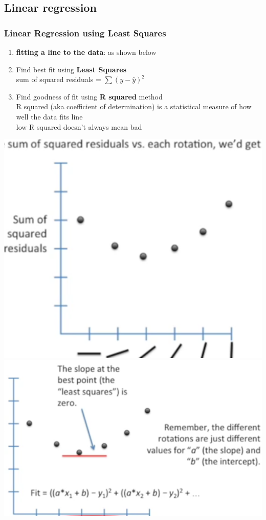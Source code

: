 \documentclass{beamer}
\begin{document}
\subsection{Linear regression}
\begin{frame}\frametitle{Linear Regression using Least Squares}
	\begin{enumerate}
		\item \textbf{fitting a line to the data}: as shown below\\
		\item Find best fit using \textbf{Least Squares}\\
		sum of squared residuals = $\sum (y-\hat{y})^2$
		\item Find goodness of fit using \textbf{R squared} method\\
		R squared (aka coefficient of determination) is a statistical measure of how well the data fits line\\
		low R squared doesn't always mean bad 
	\end{enumerate}
	\includegraphics[scale=0.15]{regression/linear}
	\includegraphics[scale=0.15]{regression/linear2}

\end{frame}
\end{document}
